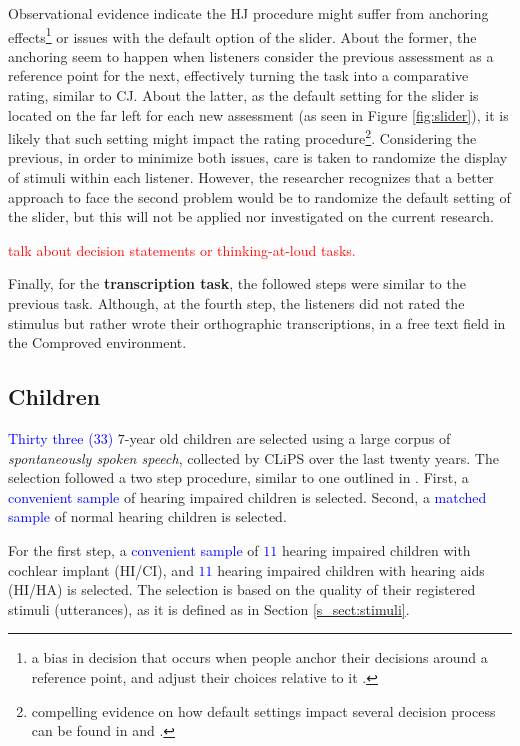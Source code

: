 Observational evidence indicate the HJ procedure might suffer from anchoring effects\footnote{a bias in decision that occurs when people anchor their decisions around a reference point, and adjust their choices relative to it \cite{Baddeley_2017, Kahneman_2013}.} or issues with the default option of the slider. About the former, the anchoring seem to happen when listeners consider the previous assessment as a reference point for the next, effectively turning the task into a comparative rating, similar to CJ. About the latter, as the default setting for the slider is located on the far left for each new assessment (as seen in Figure \ref{fig:slider}), it is likely that such setting might impact the rating procedure\footnote{compelling evidence on how default settings impact several decision process can be found in \citet{Kahneman_2013} and \citet{Johnson_et_al_2003}.}. Considering the previous, in order to minimize both issues, care is taken to randomize the display of stimuli within each listener. However, the researcher recognizes that a better approach to face the second problem would be to randomize the default setting of the slider, but this will not be applied nor investigated on the current research. 

\textcolor{red}{talk about decision statements or thinking-at-loud tasks.}

Finally, for the \textbf{transcription task}, the followed steps were similar to the previous task. Although, at the fourth step, the listeners did not rated the stimulus but rather wrote their orthographic transcriptions, in a free text field in the Comproved environment.
%
%
\subsection{Children} \label{s_sect:children}
%
\textcolor{blue}{Thirty three ($33$)} $7$-year old children are selected using a large corpus of \textit{spontaneously spoken speech}, collected by CLiPS over the last twenty years. The selection followed a two step procedure, similar to one outlined in \citet{Faes_et_al_2021}. First, a \textcolor{blue}{convenient sample} of hearing impaired children is selected. Second, a \textcolor{blue}{matched sample} of normal hearing children is selected.

For the first step, a \textcolor{blue}{convenient sample} of \textcolor{blue}{$11$} hearing impaired children with cochlear implant (HI/CI), and \textcolor{blue}{$11$} hearing impaired children with hearing aids (HI/HA) is selected. The selection is based on the quality of their registered stimuli (utterances), as it is defined as in Section \ref{s_sect:stimuli}.

